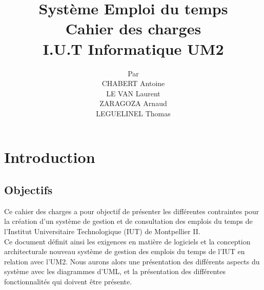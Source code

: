 \documentclass[a4paper, 11pt]{article}
\title{Système Emploi du temps\\Cahier des charges\\I.U.T Informatique UM2}
\author{Par\\CHABERT Antoine\\LE VAN Laurent\\ZARAGOZA Arnaud\\LEGUELINEL Thomas}
\begin{document}
	\maketitle
	\clearpage
	\tableofcontents
        \clearpage
	\listoffigures
	\clearpage
	\section{ Introduction}
        \subsection{ Objectifs}
        Ce cahier des charges a pour objectif de présenter les différentes contraintes pour la création d'un système de gestion et de consultation des emplois du temps de l'Institut Universitaire Technologique (IUT) de Montpellier II.\\Ce document définit ainsi les exigences en matière de logiciels et la conception architecturale nouveau système de gestion des emplois du temps de l'IUT en relation avec l'UM2. Nous aurons alors une présentation des différents aspects du système avec les diagrammes d'UML, et la présentation des différentes fonctionnalités qui doivent être présente.
\end{document}
